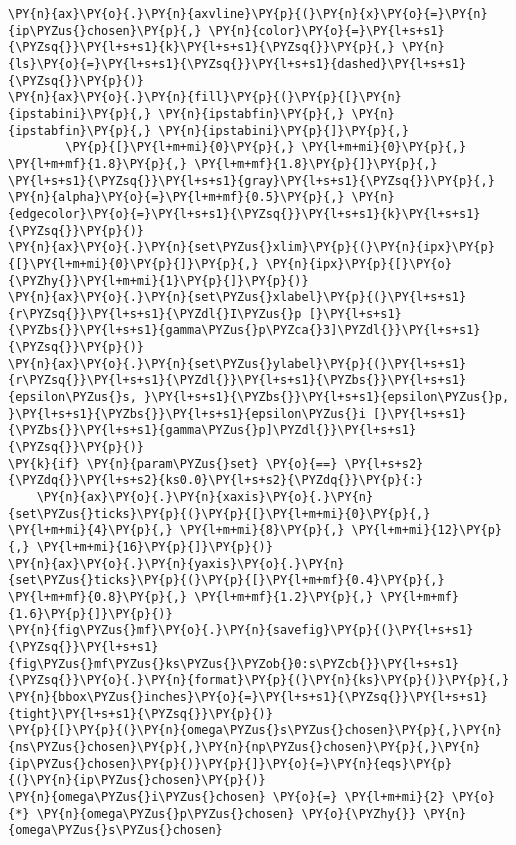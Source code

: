 \begin{Verbatim}[commandchars=\\\{\}]
\PY{n}{ax}\PY{o}{.}\PY{n}{axvline}\PY{p}{(}\PY{n}{x}\PY{o}{=}\PY{n}{ip\PYZus{}chosen}\PY{p}{,} \PY{n}{color}\PY{o}{=}\PY{l+s+s1}{\PYZsq{}}\PY{l+s+s1}{k}\PY{l+s+s1}{\PYZsq{}}\PY{p}{,} \PY{n}{ls}\PY{o}{=}\PY{l+s+s1}{\PYZsq{}}\PY{l+s+s1}{dashed}\PY{l+s+s1}{\PYZsq{}}\PY{p}{)}
\PY{n}{ax}\PY{o}{.}\PY{n}{fill}\PY{p}{(}\PY{p}{[}\PY{n}{ipstabini}\PY{p}{,} \PY{n}{ipstabfin}\PY{p}{,} \PY{n}{ipstabfin}\PY{p}{,} \PY{n}{ipstabini}\PY{p}{]}\PY{p}{,}
        \PY{p}{[}\PY{l+m+mi}{0}\PY{p}{,} \PY{l+m+mi}{0}\PY{p}{,} \PY{l+m+mf}{1.8}\PY{p}{,} \PY{l+m+mf}{1.8}\PY{p}{]}\PY{p}{,} \PY{l+s+s1}{\PYZsq{}}\PY{l+s+s1}{gray}\PY{l+s+s1}{\PYZsq{}}\PY{p}{,} \PY{n}{alpha}\PY{o}{=}\PY{l+m+mf}{0.5}\PY{p}{,} \PY{n}{edgecolor}\PY{o}{=}\PY{l+s+s1}{\PYZsq{}}\PY{l+s+s1}{k}\PY{l+s+s1}{\PYZsq{}}\PY{p}{)}
\PY{n}{ax}\PY{o}{.}\PY{n}{set\PYZus{}xlim}\PY{p}{(}\PY{n}{ipx}\PY{p}{[}\PY{l+m+mi}{0}\PY{p}{]}\PY{p}{,} \PY{n}{ipx}\PY{p}{[}\PY{o}{\PYZhy{}}\PY{l+m+mi}{1}\PY{p}{]}\PY{p}{)}
\PY{n}{ax}\PY{o}{.}\PY{n}{set\PYZus{}xlabel}\PY{p}{(}\PY{l+s+s1}{r\PYZsq{}}\PY{l+s+s1}{\PYZdl{}I\PYZus{}p [}\PY{l+s+s1}{\PYZbs{}}\PY{l+s+s1}{gamma\PYZus{}p\PYZca{}3]\PYZdl{}}\PY{l+s+s1}{\PYZsq{}}\PY{p}{)}
\PY{n}{ax}\PY{o}{.}\PY{n}{set\PYZus{}ylabel}\PY{p}{(}\PY{l+s+s1}{r\PYZsq{}}\PY{l+s+s1}{\PYZdl{}}\PY{l+s+s1}{\PYZbs{}}\PY{l+s+s1}{epsilon\PYZus{}s, }\PY{l+s+s1}{\PYZbs{}}\PY{l+s+s1}{epsilon\PYZus{}p, }\PY{l+s+s1}{\PYZbs{}}\PY{l+s+s1}{epsilon\PYZus{}i [}\PY{l+s+s1}{\PYZbs{}}\PY{l+s+s1}{gamma\PYZus{}p]\PYZdl{}}\PY{l+s+s1}{\PYZsq{}}\PY{p}{)}
\PY{k}{if} \PY{n}{param\PYZus{}set} \PY{o}{==} \PY{l+s+s2}{\PYZdq{}}\PY{l+s+s2}{ks0.0}\PY{l+s+s2}{\PYZdq{}}\PY{p}{:}
    \PY{n}{ax}\PY{o}{.}\PY{n}{xaxis}\PY{o}{.}\PY{n}{set\PYZus{}ticks}\PY{p}{(}\PY{p}{[}\PY{l+m+mi}{0}\PY{p}{,} \PY{l+m+mi}{4}\PY{p}{,} \PY{l+m+mi}{8}\PY{p}{,} \PY{l+m+mi}{12}\PY{p}{,} \PY{l+m+mi}{16}\PY{p}{]}\PY{p}{)}
\PY{n}{ax}\PY{o}{.}\PY{n}{yaxis}\PY{o}{.}\PY{n}{set\PYZus{}ticks}\PY{p}{(}\PY{p}{[}\PY{l+m+mf}{0.4}\PY{p}{,} \PY{l+m+mf}{0.8}\PY{p}{,} \PY{l+m+mf}{1.2}\PY{p}{,} \PY{l+m+mf}{1.6}\PY{p}{]}\PY{p}{)}
\PY{n}{fig\PYZus{}mf}\PY{o}{.}\PY{n}{savefig}\PY{p}{(}\PY{l+s+s1}{\PYZsq{}}\PY{l+s+s1}{fig\PYZus{}mf\PYZus{}ks\PYZus{}\PYZob{}0:s\PYZcb{}}\PY{l+s+s1}{\PYZsq{}}\PY{o}{.}\PY{n}{format}\PY{p}{(}\PY{n}{ks}\PY{p}{)}\PY{p}{,} \PY{n}{bbox\PYZus{}inches}\PY{o}{=}\PY{l+s+s1}{\PYZsq{}}\PY{l+s+s1}{tight}\PY{l+s+s1}{\PYZsq{}}\PY{p}{)}
\PY{p}{[}\PY{p}{(}\PY{n}{omega\PYZus{}s\PYZus{}chosen}\PY{p}{,}\PY{n}{ns\PYZus{}chosen}\PY{p}{,}\PY{n}{np\PYZus{}chosen}\PY{p}{,}\PY{n}{ip\PYZus{}chosen}\PY{p}{)}\PY{p}{]}\PY{o}{=}\PY{n}{eqs}\PY{p}{(}\PY{n}{ip\PYZus{}chosen}\PY{p}{)}
\PY{n}{omega\PYZus{}i\PYZus{}chosen} \PY{o}{=} \PY{l+m+mi}{2} \PY{o}{*} \PY{n}{omega\PYZus{}p\PYZus{}chosen} \PY{o}{\PYZhy{}} \PY{n}{omega\PYZus{}s\PYZus{}chosen}

\end{Verbatim}
